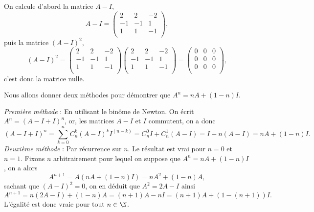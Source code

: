 {\begin{enumerate}
{On calcule d'abord la matrice $A-I$,
$$A-I=\begin{pmatrix}2&2&-2 \\  -1&-1&1 \\ 1&1&-1 \\ \end{pmatrix},$$
puis la matrice $(A-I)^2$,
$$(A-I)^2=\begin{pmatrix}2&2&-2 \\  -1&-1&1 \\ 1&1&-1 \\ \end{pmatrix}
\begin{pmatrix}2&2&-2 \\  -1&-1&1 \\ 1&1&-1 \\ \end{pmatrix}=
\begin{pmatrix}0&0&0 \\  0&0&0 \\ 0&0&0 \\ \end{pmatrix},$$ 
c'est donc la matrice nulle.

Nous allons donner deux méthodes pour démontrer que $A^n=nA+(1-n)I$.

{\it Première méthode} :  En utilisant le bin\^ome de Newton. On écrit $A^n=(A-I+I)^n$, or, les matrices $A-I$ et $I$ commutent, on a donc
$$(A-I+I)^n=\sum_{k=0}^nC_n^k(A-I)^kI^{(n-k)}=C_n^0I+C_n^1(A-I)=I+n(A-I)=nA+(1-n)I.$$
{\it Deuxième méthode} : Par récurrence sur $n$. Le résultat est vrai pour $n=0$ et $n=1$. Fixons $n$ arbitrairement pour lequel on suppose que $A^n=nA+(1-n)I$, on a alors
$$A^{n+1}=A(nA+(1-n)I)=nA^2+(1-n)A,$$
sachant que $(A-I)^2=0$, on en déduit que $A^2=2A-I$ ainsi
$$A^{n+1}=n(2A-I)+(1-n)A=(n+1)A-nI=(n+1)A+(1-(n+1))I.$$
L'égalité est donc vraie pour tout $n\in\N$.}
\end{enumerate}
}
